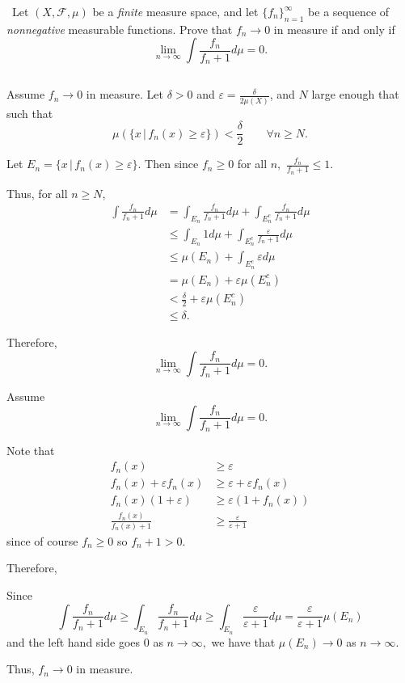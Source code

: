 \documentclass[12pt]{Homework}
\begin{document}
\begin{problem} $\,$
Let $(X,\mathscr{F},\mu)$ be a \textit{finite} measure space, and let $\{f_n\}_{n=1}^\infty$ be a sequence of \textit{nonnegative} measurable functions. Prove that $f_n\to0$ in measure if and only if $$\lim_{n\to\infty}\int\frac{f_n}{f_n+1}d\mu=0.$$
\end{problem}


\begin{solution}$\,$

\boxed{\implies} Assume $f_n\to0$ in measure. Let $\delta>0$ and $\varepsilon=\frac{\delta}{2\mu(X)}$, and $N$ large enough that such that $$\mu(\{x\,|\,f_n(x)\ge\varepsilon\})<\frac{\delta}{2}\qquad \forall n\ge N.$$


Let $E_n=\{x\,|\,f_n(x)\ge\varepsilon\}$. Then since $f_n\ge0$ for all $n,$ $\frac{f_n}{f_n+1}\le1$.

Thus, for all $n\ge N$, \begin{align*}
    \int\frac{f_n}{f_n+1}d\mu&=\int_{E_n}\frac{f_n}{f_n+1}d\mu+\int_{E_n^c}\frac{f_n}{f_n+1}d\mu\\
    &\le\int_{E_n}1d\mu+\int_{E_n^c}\frac{\varepsilon}{f_n+1}d\mu\\
    &\le\mu(E_n)+\int_{E_n^c}\varepsilon d\mu\\
     &=\mu(E_n)+\varepsilon\mu(E_n^c)\\
     &<\frac{\delta}{2}+\varepsilon\mu(E_n^c)\\
     &\le\delta.
\end{align*}

Therefore, $$\lim_{n\to\infty}\int\frac{f_n}{f_n+1}d\mu=0.$$

\boxed{\impliedby} Assume $$\lim_{n\to\infty}\int\frac{f_n}{f_n+1}d\mu=0.$$

Note that \begin{align*}
    f_n(x)&\ge\varepsilon\\
    f_n(x)+\varepsilon f_n(x)&\ge\varepsilon+\varepsilon f_n(x)\\
    f_n(x)(1+\varepsilon)&\ge\varepsilon(1+f_n(x))\\
    \frac{f_n(x)}{f_n(x)+1}&\ge \frac{\varepsilon}{\varepsilon+1}
\end{align*} since of course $f_n\ge0$ so $f_n+1>0.$

Therefore,

Since $$\int\frac{f_n}{f_n+1}d\mu\ge\int_{E_n}\frac{f_n}{f_n+1}d\mu\ge\int_{E_n}\frac{\varepsilon}{\varepsilon+1}d\mu=\frac{\varepsilon}{\varepsilon+1}\mu(E_n)$$ and the left hand side goes $0$ as $n\to\infty,$ we have that $\mu(E_n)\to0$ as $n\to\infty.$

Thus, $f_n\to0$ in measure.
\end{solution}
\newpage
\end{document}

